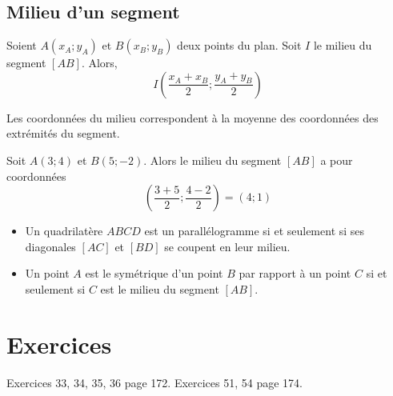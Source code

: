 \documentclass{article}
\begin{document}
\subsection*{Milieu d'un segment}
\begin{proposition}
Soient $A(x_A;y_A)$ et $B(x_B;y_B)$ deux points du plan. Soit $I$ le milieu du segment $[AB]$. Alors,
\begin{equation*}
I\left(\dfrac{x_A + x_B}{2};\dfrac{y_A + y_B}{2}\right)
\end{equation*}
\end{proposition}
\begin{remark}
Les coordonnées du milieu correspondent à la moyenne des coordonnées des extrémités du segment.
\end{remark}
\begin{example}
Soit $A(3;4)$ et $B(5;-2)$. Alors le milieu du segment $[AB]$ a pour coordonnées
\begin{equation*}
\left(\dfrac{3+5}{2};\dfrac{4-2}{2}\right) = \left(4;1\right)
\end{equation*}
\end{example}
\begin{remark}
\begin{itemize}
\item Un quadrilatère $ABCD$ est un parallélogramme si et seulement si ses diagonales $[AC]$ et $[BD]$ se coupent en leur milieu.
\item Un point $A$ est le symétrique d'un point $B$ par rapport à un point $C$ si et seulement si $C$ est le milieu du segment $[AB]$.
\end{itemize}
\end{remark}
\section{Exercices}
Exercices 33, 34, 35, 36 page 172.
Exercices 51, 54 page 174.
\end{document}
